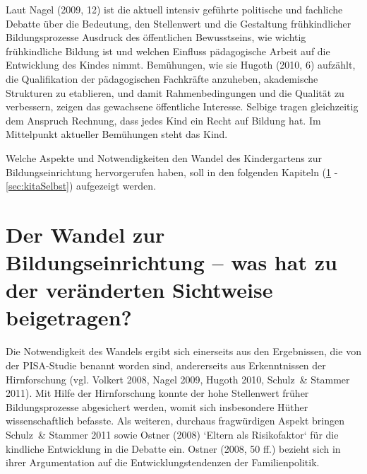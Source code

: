 Laut Nagel (2009, 12) ist die aktuell intensiv geführte politische und fachliche Debatte über die Bedeutung, den Stellenwert und die Gestaltung frühkindlicher Bildungsprozesse Ausdruck des öffentlichen Bewusstseins, wie wichtig frühkindliche Bildung ist und welchen Einfluss pädagogische Arbeit auf die Entwicklung des Kindes nimmt. Bemühungen, wie sie Hugoth (2010, 6) aufzählt, die Qualifikation der pädagogischen Fachkräfte anzuheben, akademische Strukturen zu etablieren, und damit Rahmenbedingungen und die Qualität zu verbessern, zeigen das gewachsene öffentliche Interesse. Selbige tragen gleichzeitig dem Anspruch Rechnung, dass jedes Kind ein Recht auf Bildung hat. Im Mittelpunkt aktueller Bemühungen steht das Kind.   

Welche Aspekte und Notwendigkeiten den Wandel des Kindergartens zur Bildungseinrichtung hervorgerufen haben, soll in den folgenden Kapiteln (\ref{sec:kitaWandel} - \ref{sec:kitaSelbst}) aufgezeigt werden. 

\section{Der Wandel zur Bildungseinrichtung – was hat zu der veränderten Sichtweise beigetragen?}\label{sec:kitaWandel}
Die Notwendigkeit des Wandels ergibt sich einerseits aus den Ergebnissen, die von der PISA-Studie benannt worden sind, andererseits aus Erkenntnissen der Hirnforschung (vgl. Volkert 2008, Nagel 2009, Hugoth 2010, Schulz~\& Stammer 2011). Mit Hilfe der Hirnforschung konnte der hohe Stellenwert früher Bildungsprozesse abgesichert werden, womit sich insbesondere Hüther wissenschaftlich befasste. Als weiteren, durchaus fragwürdigen Aspekt bringen Schulz~\& Stammer 2011 sowie Ostner (2008) ‘Eltern als Risikofaktor‘ für die kindliche Entwicklung in die Debatte ein. Ostner (2008, 50 ff.) bezieht sich in ihrer Argumentation auf die Entwicklungstendenzen der Familienpolitik. 

